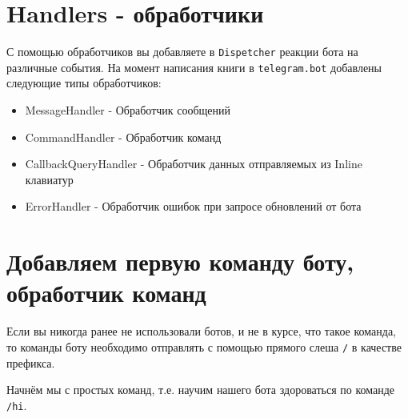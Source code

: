 \documentclass[
]{book}
\providecommand{\tightlist}{%
  \setlength{\itemsep}{0pt}\setlength{\parskip}{0pt}}
\begin{document}
\section{Handlers - обработчики}\label{handlers---ux43eux431ux440ux430ux431ux43eux442ux447ux438ux43aux438}

С помощью обработчиков вы добавляете в \texttt{Dispetcher} реакции бота на различные события. На момент написания книги в \texttt{telegram.bot} добавлены следующие типы обработчиков:

\begin{itemize}
\tightlist
\item
  MessageHandler - Обработчик сообщений
\item
  CommandHandler - Обработчик команд
\item
  CallbackQueryHandler - Обработчик данных отправляемых из Inline клавиатур
\item
  ErrorHandler - Обработчик ошибок при запросе обновлений от бота
\end{itemize}

\section{Добавляем первую команду боту, обработчик команд}\label{ux434ux43eux431ux430ux432ux43bux44fux435ux43c-ux43fux435ux440ux432ux443ux44e-ux43aux43eux43cux430ux43dux434ux443-ux431ux43eux442ux443-ux43eux431ux440ux430ux431ux43eux442ux447ux438ux43a-ux43aux43eux43cux430ux43dux434}

Если вы никогда ранее не использовали ботов, и не в курсе, что такое команда, то команды боту необходимо отправлять с помощью прямого слеша \texttt{/} в качестве префикса.

Начнём мы с простых команд, т.е. научим нашего бота здороваться по команде \texttt{/hi}.
\end{document}
